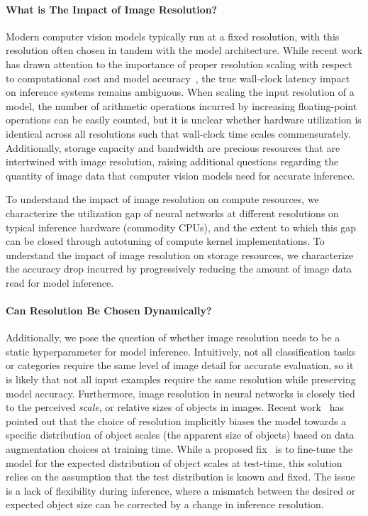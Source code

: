 \paragraph{What is The Impact of Image Resolution?}
Modern computer vision models typically run at a fixed resolution, with this resolution often chosen in tandem with the model architecture.
While recent work has drawn attention to the importance of proper resolution scaling with respect to computational cost and model accuracy~\cite{tan2019efficientnet}, the true wall-clock latency impact on inference systems remains ambiguous.
When scaling the input resolution of a model, the number of arithmetic operations incurred by increasing floating-point operations can be easily counted, but it is unclear whether hardware utilization is identical across all resolutions such that wall-clock time scales commensurately.
Additionally, storage capacity and bandwidth are precious resources that are intertwined with image resolution, raising additional questions regarding the quantity of image data that computer vision models need for accurate inference.

To understand the impact of image resolution on compute resources, we characterize the utilization gap of neural networks at different resolutions on typical inference hardware (commodity CPUs), and the extent to which this gap can be closed through autotuning of compute kernel implementations.
To understand the impact of image resolution on storage resources, we characterize the accuracy drop incurred by progressively reducing the amount of image data read for model inference.

\paragraph{Can Resolution Be Chosen Dynamically?}
Additionally, we pose the question of whether image resolution needs to be a static hyperparameter for model inference.
Intuitively, not all classification tasks or categories require the same level of image detail for accurate evaluation, so it is likely that not all input examples require the same resolution while preserving model accuracy.
Furthermore, image resolution in neural networks is closely tied to the perceived \emph{scale}, or relative sizes of objects in images.
Recent work~\cite{touvron2019fixing} has pointed out that the choice of resolution implicitly biases the model towards a specific distribution of object scales (the apparent size of objects) based on data augmentation choices at training time.
While a proposed fix~\cite{touvron2019fixing} is to fine-tune the model for the expected distribution of object scales at test-time, this solution relies on the assumption that the test distribution is known and fixed.
The issue is a lack of flexibility during inference, where a mismatch between the desired or expected object size can be corrected by a change in inference resolution.

